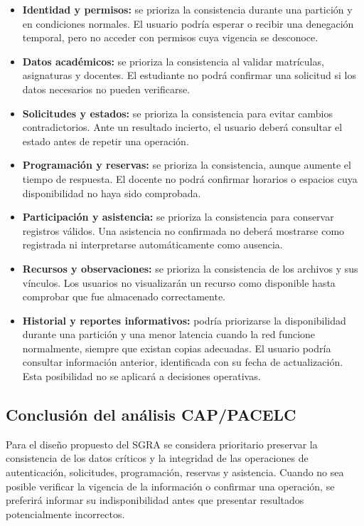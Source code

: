 \begin{itemize}
    \item \textbf{Identidad y permisos:} se prioriza la consistencia durante una partición y en condiciones normales. El usuario podría esperar o recibir una denegación temporal, pero no acceder con permisos cuya vigencia se desconoce.

    \item \textbf{Datos académicos:} se prioriza la consistencia al validar matrículas, asignaturas y docentes. El estudiante no podrá confirmar una solicitud si los datos necesarios no pueden verificarse.

    \item \textbf{Solicitudes y estados:} se prioriza la consistencia para evitar cambios contradictorios. Ante un resultado incierto, el usuario deberá consultar el estado antes de repetir una operación.

    \item \textbf{Programación y reservas:} se prioriza la consistencia, aunque aumente el tiempo de respuesta. El docente no podrá confirmar horarios o espacios cuya disponibilidad no haya sido comprobada.

    \item \textbf{Participación y asistencia:} se prioriza la consistencia para conservar registros válidos. Una asistencia no confirmada no deberá mostrarse como registrada ni interpretarse automáticamente como ausencia.

    \item \textbf{Recursos y observaciones:} se prioriza la consistencia de los archivos y sus vínculos. Los usuarios no visualizarán un recurso como disponible hasta comprobar que fue almacenado correctamente.

    \item \textbf{Historial y reportes informativos:} podría priorizarse la disponibilidad durante una partición y una menor latencia cuando la red funcione normalmente, siempre que existan copias adecuadas. El usuario podría consultar información anterior, identificada con su fecha de actualización. Esta posibilidad no se aplicará a decisiones operativas.
\end{itemize}

\subsection{Conclusión del análisis CAP/PACELC}

Para el diseño propuesto del SGRA se considera prioritario preservar la consistencia de los datos críticos y la integridad de las operaciones de autenticación, solicitudes, programación, reservas y asistencia. Cuando no sea posible verificar la vigencia de la información o confirmar una operación, se preferirá informar su indisponibilidad antes que presentar resultados potencialmente incorrectos.

